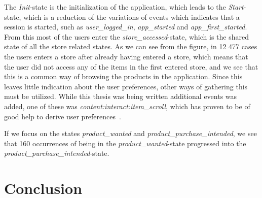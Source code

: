         The \emph{Init}-state is the initialization of the application, which leads to the \emph{Start}-state, which is a reduction of the variations of events which indicates that a session is started, such as \emph{user\_logged\_in}, \emph{app\_started} and \emph{app\_first\_started}.
        From this most of the users enter the \emph{store\_accessed}-state, which is the shared state of all the store related states.
        As we can see from the figure, in 12 477 cases the users enters a store after already having entered a store, which means that the user did not access any of the items in the first entered store, and we see that this is a common way of browsing the products in the application. Since this leaves little indication about the user preferences, other ways of gathering this must be utilized.
        While this thesis was being written additional events was added, one of these was \emph{content:interact:item\_scroll}, which has proven to be of good help to derive user preferences~\cite{Claypool01inferringuser}.

        If we focus on the states \emph{product\_wanted} and \emph{product\_purchase\_intended}, we see that 160 occurrences of being in the \emph{product\_wanted}-state progressed into the \emph{product\_purchase\_intended}-state.










\section{Conclusion}
\label{sec:dataset-conclusion}


